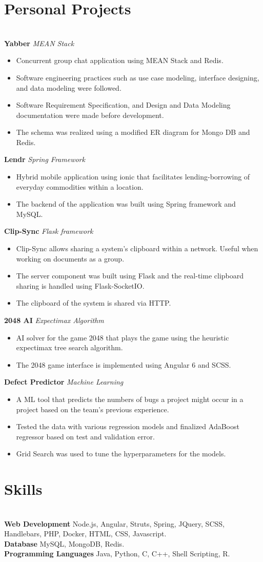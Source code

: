 \documentclass{resume}
\begin{document}
\section*{Personal Projects}
\titlerule
\noindent
\\
\textbf{Yabber} \hfill \textit{MEAN Stack}
\begin{itemize}
  \item Concurrent group chat application using MEAN Stack and Redis.
  \item Software engineering practices such as use case modeling, interface designing, and data modeling were followed.
  \item Software Requirement Specification, and Design and Data Modeling documentation were made before development.
  \item The schema was realized using a modified ER diagram for Mongo DB and Redis.
\end{itemize}
\textbf{Lendr} \hfill \textit{Spring Framework}
\begin{itemize}
  \item Hybrid mobile application using ionic that facilitates lending-borrowing of everyday commodities within a location.
  \item The backend of the application was built using Spring framework and MySQL.
\end{itemize}
\textbf{Clip-Sync} \hfill \textit{Flask framework}
\begin{itemize}
  \item Clip-Sync allows sharing a system's clipboard within a network. Useful when working on documents as a group.
  \item The server component was built using Flask and the real-time clipboard sharing is handled using Flask-SocketIO.
  \item The clipboard of the system is shared via HTTP.
\end{itemize}
\textbf{2048 AI} \hfill \textit{Expectimax Algorithm}
\begin{itemize}
  \item AI solver for the game 2048 that plays the game using the heuristic expectimax tree search algorithm.
  \item The 2048 game interface is implemented using Angular 6 and SCSS.
\end{itemize}
\textbf{Defect Predictor} \hfill \textit{Machine Learning}
\begin{itemize}
  \item A ML tool that predicts the numbers of bugs a project might occur in a project based on the team's previous experience.
  \item Tested the data with various regression models and finalized AdaBoost regressor based on test and validation error.
  \item Grid Search was used to tune the hyperparameters for the models.
\end{itemize}
\section*{Skills}
\titlerule
\noindent
\\
\textbf{Web Development} Node.js, Angular, Struts, Spring, JQuery, SCSS, Handlebars, PHP, Docker, HTML, CSS, Javascript. \\
\textbf{Database} MySQL, MongoDB, Redis. \\
\textbf{Programming Languages} Java, Python, C, C++, Shell Scripting, R.\\
\end{document}
